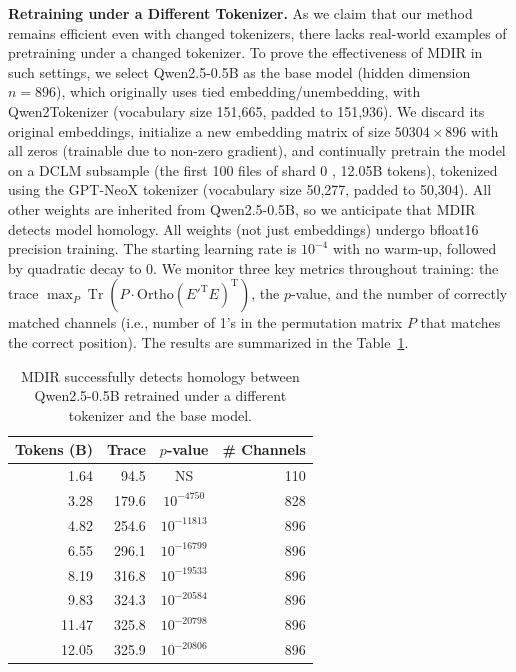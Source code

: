 \documentclass{article} %
\DeclareMathOperator{\Tr}{Tr}
\begin{document}
\textbf{Retraining under a Different Tokenizer.} As we claim that our method remains efficient even with changed tokenizers, there lacks real-world examples of pretraining under a changed tokenizer. To prove the effectiveness of MDIR in such settings, we select Qwen2.5-0.5B as the base model (hidden dimension $n=896$), which originally uses tied embedding/unembedding, with Qwen2Tokenizer (vocabulary size 151,665, padded to 151,936). We discard its original embeddings, initialize a new embedding matrix of size $50304 \times 896$ with all zeros (trainable due to non-zero gradient), and continually pretrain the model on a DCLM subsample \citep{li2025datacomplmsearchgenerationtraining} (the first 100 files of shard 0 \citep{dclm_baseline_shard_2024}, 12.05B tokens), tokenized using the GPT-NeoX tokenizer (vocabulary size 50,277, padded to 50,304). All other weights are inherited from Qwen2.5-0.5B, so we anticipate that MDIR detects model homology. All weights (not just embeddings) undergo bfloat16 precision training. The starting learning rate is $10^{-4}$ with no warm-up, followed by quadratic decay to 0. We monitor three key metrics throughout training: the trace $\max_P\Tr\left(P \cdot \mathrm{Ortho}(E'^{\text{T}}E)^{\text{T}}\right)$,
the $p$-value, and the number of correctly matched channels (i.e., number of 1's in the permutation matrix $P$ that matches the correct position). The results are summarized in the Table~\ref{tab:summary}.
\begin{table}[h]
\centering
\small
\caption{MDIR successfully detects homology between Qwen2.5-0.5B retrained under a different tokenizer and the base model.}
\label{tab:summary}
\begin{tabular}{rrcr}
\toprule
Tokens (B) & Trace & $p$-value & \# Channels \\
\midrule
1.64 & 94.5 & NS & 110 \\
3.28 & 179.6 & $10^{-4750}$ & 828 \\
4.82 & 254.6 & $10^{-11813}$ & 896 \\
6.55 & 296.1 & $10^{-16799}$ & 896 \\
8.19 & 316.8 & $10^{-19533}$ & 896 \\
9.83 & 324.3 & $10^{-20584}$ & 896 \\
11.47 & 325.8 & $10^{-20798}$ & 896 \\
12.05 & 325.9 & $10^{-20806}$ & 896 \\
\bottomrule
\end{tabular}
\end{table}
\end{document}
